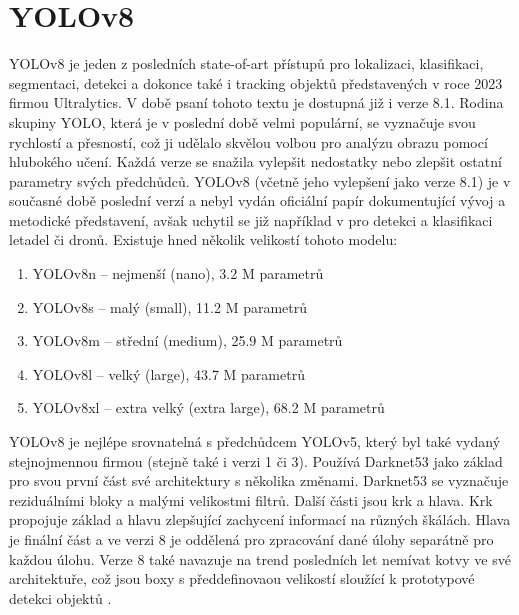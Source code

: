 \section{YOLOv8}
\label{sec:Chapter26}
YOLOv8 je jeden z posledních state-of-art přístupů pro lokalizaci, klasifikaci, segmentaci, detekci a dokonce také i tracking objektů představených v roce 2023 firmou Ultralytics. V době psaní tohoto textu je dostupná již i verze 8.1. Rodina skupiny YOLO, která je v poslední době velmi populární, se vyznačuje svou rychlostí a přesností, což ji udělalo skvělou volbou pro analýzu obrazu pomocí hlubokého učení. Každá verze se snažila vylepšit nedostatky nebo zlepšit ostatní parametry svých předchůdců. YOLOv8 (včetně jeho vylepšení jako verze 8.1) je v současné době poslední verzí a nebyl vydán oficiální papír dokumentující vývoj a metodické představení, avšak uchytil se již například v \cite{yoloplane} pro detekci a klasifikaci letadel či dronů. Existuje hned několik velikostí tohoto modelu:
\begin{enumerate}
  \item YOLOv8n -- nejmenší (nano), 3.2 M parametrů
  \item YOLOv8s -- malý (small), 11.2 M parametrů
  \item YOLOv8m -- střední (medium), 25.9 M parametrů
  \item YOLOv8l -- velký (large), 43.7 M parametrů
  \item YOLOv8xl -- extra velký (extra large), 68.2 M parametrů
\end{enumerate}

YOLOv8 je nejlépe srovnatelná s předchůdcem YOLOv5, který byl také vydaný stejnojmennou firmou (stejně také i verzi 1 či 3). Používá Darknet53 \cite{darknet} jako základ pro svou první část své architektury s několika změnami. Darknet53 se vyznačuje reziduálními bloky a malými velikostmi filtrů. Další části jsou krk a hlava. Krk propojuje základ a hlavu zlepšující zachycení informací na různých škálách. Hlava je finální část a ve verzi 8 je oddělená pro zpracování dané úlohy separátně pro každou úlohu. Verze 8 také navazuje na trend posledních let nemívat kotvy ve své architektuře, což jsou boxy s předdefinovaou velikostí sloužící k prototypové detekci objektů \cite{yolo_comparison}.


\endinput